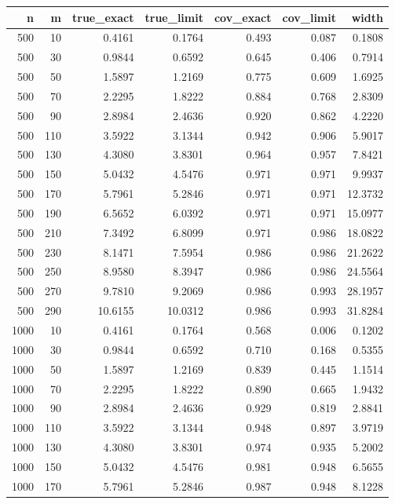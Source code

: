 \begin{tabular}{rrrrrrr}
  \hline
n & m & true\_exact & true\_limit & cov\_exact & cov\_limit & width \\ 
  \hline
500 & 10 & 0.4161 & 0.1764 & 0.493 & 0.087 & 0.1808 \\ 
  500 & 30 & 0.9844 & 0.6592 & 0.645 & 0.406 & 0.7914 \\ 
  500 & 50 & 1.5897 & 1.2169 & 0.775 & 0.609 & 1.6925 \\ 
  500 & 70 & 2.2295 & 1.8222 & 0.884 & 0.768 & 2.8309 \\ 
  500 & 90 & 2.8984 & 2.4636 & 0.920 & 0.862 & 4.2220 \\ 
  500 & 110 & 3.5922 & 3.1344 & 0.942 & 0.906 & 5.9017 \\ 
  500 & 130 & 4.3080 & 3.8301 & 0.964 & 0.957 & 7.8421 \\ 
  500 & 150 & 5.0432 & 4.5476 & 0.971 & 0.971 & 9.9937 \\ 
  500 & 170 & 5.7961 & 5.2846 & 0.971 & 0.971 & 12.3732 \\ 
  500 & 190 & 6.5652 & 6.0392 & 0.971 & 0.971 & 15.0977 \\ 
  500 & 210 & 7.3492 & 6.8099 & 0.971 & 0.986 & 18.0822 \\ 
  500 & 230 & 8.1471 & 7.5954 & 0.986 & 0.986 & 21.2622 \\ 
  500 & 250 & 8.9580 & 8.3947 & 0.986 & 0.986 & 24.5564 \\ 
  500 & 270 & 9.7810 & 9.2069 & 0.986 & 0.993 & 28.1957 \\ 
  500 & 290 & 10.6155 & 10.0312 & 0.986 & 0.993 & 31.8284 \\ 
  1000 & 10 & 0.4161 & 0.1764 & 0.568 & 0.006 & 0.1202 \\ 
  1000 & 30 & 0.9844 & 0.6592 & 0.710 & 0.168 & 0.5355 \\ 
  1000 & 50 & 1.5897 & 1.2169 & 0.839 & 0.445 & 1.1514 \\ 
  1000 & 70 & 2.2295 & 1.8222 & 0.890 & 0.665 & 1.9432 \\ 
  1000 & 90 & 2.8984 & 2.4636 & 0.929 & 0.819 & 2.8841 \\ 
  1000 & 110 & 3.5922 & 3.1344 & 0.948 & 0.897 & 3.9719 \\ 
  1000 & 130 & 4.3080 & 3.8301 & 0.974 & 0.935 & 5.2002 \\ 
  1000 & 150 & 5.0432 & 4.5476 & 0.981 & 0.948 & 6.5655 \\ 
  1000 & 170 & 5.7961 & 5.2846 & 0.987 & 0.948 & 8.1228 \\ 

\end{tabular}

